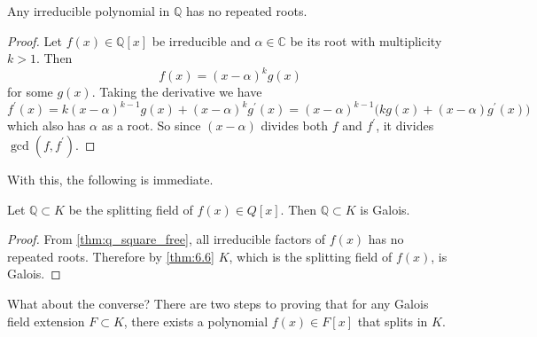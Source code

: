   \begin{lemma}
    \label{thm:q_square_free}
    Any irreducible polynomial in $\mathbb{Q}$ has no repeated roots. 
  \end{lemma}
  \begin{proof}
    Let $f(x) \in \mathbb{Q}[x]$ be irreducible and $\alpha \in \mathbb{C}$ be its root with multiplicity $k > 1$. Then 
    \begin{equation}
      f(x) = (x - \alpha)^k g(x)
    \end{equation}
    for some $g(x)$. Taking the derivative we have 
    \begin{equation}
      f^\prime(x) = k (x - \alpha)^{k-1} g(x) + (x - \alpha)^k g^\prime (x) = (x - \alpha)^{k-1} \big( k g(x) + (x - \alpha) g^\prime(x) \big)
    \end{equation}
    which also has $\alpha$ as a root. So since $(x - \alpha)$ divides both $f$ and $f^\prime$, it divides $\gcd(f, f^\prime)$. 
  \end{proof}

  With this, the following is immediate. 

  \begin{theorem}
    Let $\mathbb{Q} \subset K$ be the splitting field of $f(x) \in Q[x]$. Then $\mathbb{Q} \subset K$ is Galois. 
  \end{theorem} 
  \begin{proof}
    From \ref{thm:q_square_free}, all irreducible factors of $f(x)$ has no repeated roots. Therefore by \ref{thm:6.6} $K$, which is the splitting field of $f(x)$, is Galois. 
  \end{proof}

  What about the converse? There are two steps to proving that for any Galois field extension $F \subset K$, there exists a polynomial $f(x) \in F[x]$ that splits in $K$. 

